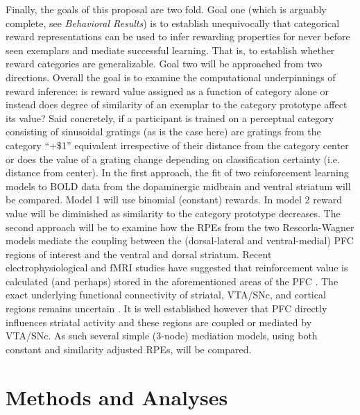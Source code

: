 \documentclass[doc,12pt]{apa}        %
\begin{document}
Finally, the goals of this proposal are two fold.  Goal one (which is arguably complete, see \emph{Behavioral Results}) is to establish unequivocally that categorical reward representations can be used to infer rewarding properties for never before seen exemplars and mediate successful learning.  That is, to establish whether reward categories are generalizable.  Goal two will be approached from two directions.  Overall the goal is to examine the computational underpinnings of reward inference: is reward value assigned as a function of category alone or instead does degree of similarity of an exemplar to the category prototype affect its value? Said concretely, if a participant is trained on a perceptual category consisting of sinusoidal gratings (as is the case here) are gratings from the category ``+\$1'' equivalent irrespective of their distance from the category center or does the value of a grating change depending on classification certainty (i.e. distance from center).  In the first approach, the fit of two reinforcement learning models to BOLD data from the dopaminergic midbrain and ventral striatum will be compared.  Model 1 will use binomial (constant) rewards. In model 2 reward value will be diminished as similarity to the category prototype decreases.  The second approach will be to examine how the RPEs from the two Rescorla-Wagner models mediate the coupling between the (dorsal-lateral and ventral-medial) PFC regions of interest and the ventral and dorsal striatum.  Recent electrophysiological and fMRI studies have suggested that reinforcement value is calculated (and perhaps) stored in the aforementioned areas of the PFC \cite{Daw:2011p7995,Bornstein:2011p7996,Frank:2011p8152,OReilly:2010p7612,OReilly:2006p1161,OReilly:2006p2615}.  The exact underlying functional connectivity of striatal, VTA/SNc, and cortical regions remains uncertain \cite{Daw:2011p7995,Bornstein:2011p7996,Frank:2011p8152}.  It is well established however that PFC directly influences striatal activity and these regions are coupled or mediated by VTA/SNc.   As such several simple (3-node) mediation models, using both constant and similarity adjusted RPEs, will be compared.

\section{Methods and Analyses} %
\label{sec:methods}
\end{document}
